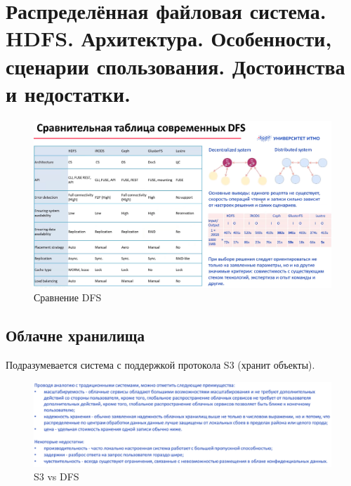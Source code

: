 \section{Распределённая файловая система. HDFS. Архитектура. Особенности, сценарии спользования. Достоинства и недостатки.}


\begin{figure}[h]
	\centering
	\begin{minipage}[b]{0.8\textwidth}
		\includegraphics[width=\textwidth]{images/dfs.png}
		\caption{Сравнение DFS}
	\end{minipage}
\end{figure}

\subsection*{Облачне хранилища}

Подразумевается система с поддержкой протокола S3 (хранит объекты).

\begin{figure}[h]
	\centering
	\begin{minipage}[b]{0.8\textwidth}
		\includegraphics[width=\textwidth]{images/s3dfs.png}
		\caption{S3 vs DFS}
	\end{minipage}
\end{figure}

